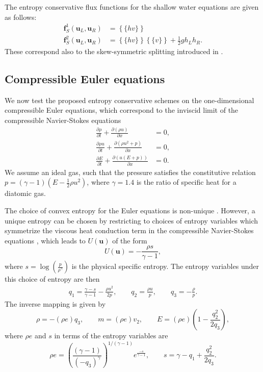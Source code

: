 \documentclass[preprint,10pt]{article}
\theoremstyle{definition}
\theoremstyle{lemma}
\theoremstyle{theorem}
\theoremstyle{assumption}
\newcommand{\pd}[2]{\frac{\partial#1}{\partial#2}}
\newcommand{\LRp}[1]{\left( #1 \right)}
\newcommand{\LRc}[1]{\left\{ #1 \right\}}
\newcommand{\avg}[1] {\ensuremath{\LRc{\!\{#1\}\!}}}
\begin{document}
The entropy conservative flux functions for the shallow water equations are given as follows:
\begin{align*}
\bm{f}^1_S(\bm{u}_L,\bm{u}_R)&= \avg{h v}\\
\bm{f}^2_S(\bm{u}_L,\bm{u}_R) &= \avg{hv}\avg{v} + \frac{1}{2}g h_L h_R.  
\end{align*}
These correspond also to the skew-symmetric splitting introduced in \cite{gassner2016well}.  

\subsection{Compressible Euler equations}

We now test the proposed entropy conservative schemes on the one-dimensional compressible Euler equations, which correspond to the inviscid limit of the compressible Navier-Stokes equations
\begin{align*}
\pd{\rho}{t} + \pd{\LRp{\rho u}}{x} &= 0,\\
\pd{\rho u}{t} + \pd{\LRp{\rho u^2 + p }}{x} &= 0,\\
\pd{E}{t} + \pd{\LRp{u(E+p)}}{x} &= 0.
\end{align*}
We assume an ideal gas, such that the pressure satisfies the constitutive relation $p = (\gamma-1)\LRp{E - \frac{1}{2}\rho u^2}$, where $\gamma = 1.4$ is the ratio of specific heat for a diatomic gas.    

The choice of convex entropy for the Euler equations is non-unique \cite{harten1983symmetric}.  However, a unique entropy can be chosen by restricting to choices of entropy variables which symmetrize the viscous heat conduction term in the compressible Navier-Stokes equations \cite{hughes1986new}, which leads to $U(\bm{u})$ of the form
\[
U(\bm{u}) = -\frac{\rho s}{\gamma-1},
\]
where $s = \log\LRp{\frac{p}{\rho^\gamma}}$ is the physical specific entropy.  The entropy variables under this choice of entropy are then
\begin{align*}
q_1 = \frac{\gamma-s}{\gamma-1} - \frac{\rho u^2}{2p}, \qquad q_2 = \frac{\rho u}{p}, \qquad q_3 = -\frac{\rho}{p}.
\end{align*}
The inverse mapping is given by 
\[
\rho = -(\rho e) q_3, \qquad m = (\rho e) v_2, \qquad E = (\rho e)\LRp{1 - \frac{q_2^2}{2 q_3}},
\]
where $\rho e$ and $s$ in terms of the entropy variables are 
\[
\rho e = \LRp{\frac{(\gamma-1)}{\LRp{-q_3}^{\gamma}}}^{1/(\gamma-1)}e^{\frac{-s}{\gamma-1}}, \qquad s = \gamma - q_1 + \frac{q_2^2}{2q_3}.
\]
\end{document}
